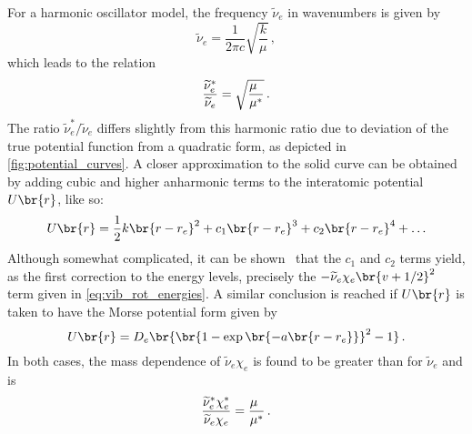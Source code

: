 For a harmonic oscillator model, the frequency \( \widetilde{\nu}_e \) in wavenumbers is given by 
\begin{equation}
	\widetilde{\nu}_e = \frac{1}{2 \pi c} \sqrt{\frac{k}{\mu}} \, ,
	\label{eq:ho_freq}
\end{equation}
which leads to the relation 
\begin{equation}
	\frac{\widetilde{\nu}_e^*}{\widetilde{\nu}_e} = \sqrt{\frac{\mu\hphantom{^*}}{\mu^*}}\, .
	\label{eq:ho_freq_relation}
\end{equation}
The ratio \( \widetilde{\nu}_e^* / \widetilde{\nu}_e \) differs slightly from this harmonic ratio due to deviation of the true potential function from a quadratic form, as depicted in \cref{fig:potential_curves}. 
A closer approximation to the solid curve can be obtained by adding cubic and higher anharmonic terms to the interatomic potential \( U\br{r} \), like so:
\begin{equation}
	U\br{r} = \frac{1}{2} k \br{r - r_e}^2 + c_1 \br{r - r_e}^3 + c_2 \br{r - r_e}^4 + \ldots
	\label{eq:anharmonic_expansion}
\end{equation}
Although somewhat complicated, it can be shown~\autocite{herzberg89,levine75} that the \( c_1 \) and \( c_2 \) terms yield, as the first correction to the energy levels, precisely the \( -\widetilde{\nu}_e \chi_e \br{v + {1}/{2}}^2 \) term given in \cref{eq:vib_rot_energies}. 
A similar conclusion is reached if \( U\br{r} \) is taken to have the Morse potential form given by 
\begin{equation}
	U\br{r} = D_e \br{\br{1 - \exp\br{-a\br{r - r_e}}}^2 - 1} \, .
	\label{eq_morse_potential}
\end{equation}
In both cases, the mass dependence of \( \widetilde{\nu}_e \chi_e \) is found to be greater than for \( \widetilde{\nu}_e \) and is
\begin{equation}
	\frac{\widetilde{\nu}_e^* \chi_e^*}{\widetilde{\nu}_e \chi_e } = \frac{\mu\hphantom{^*}}{\mu^*} \, .
	\label{eq:ve_isotope_relation}
\end{equation}
